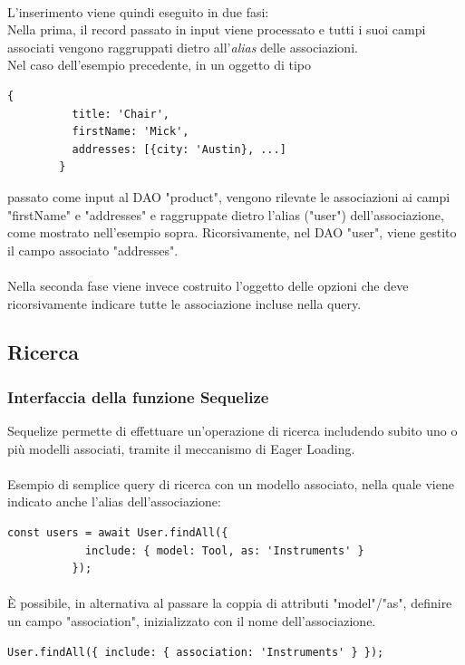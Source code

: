 \documentclass[a4paper, 12pt]{report}
\begin{document}
      \paragraph*{}
      L'inserimento viene quindi eseguito in due fasi:\\
      Nella prima, il record passato in input viene processato e tutti i suoi campi associati vengono raggruppati dietro all'\emph{alias} delle associazioni.\\
      Nel caso dell'esempio precedente, in un oggetto di tipo
      \begin{Verbatim}[samepage=true]
        {
          title: 'Chair', 
          firstName: 'Mick',
          addresses: [{city: 'Austin}, ...]
        }
      \end{Verbatim}
      passato come input al DAO "product", vengono rilevate le associazioni ai campi "firstName" e "addresses" e raggruppate dietro l'alias ("user") dell'associazione, come mostrato nell'esempio sopra.
      Ricorsivamente, nel DAO "user", viene gestito il campo associato "addresses".
      \paragraph*{}
      Nella seconda fase viene invece costruito l'oggetto delle opzioni che deve ricorsivamente indicare tutte le associazione incluse nella query.

    \newpage
    \subsection{Ricerca}
      \subsubsection*{Interfaccia della funzione Sequelize}
        Sequelize permette di effettuare un'operazione di ricerca includendo subito uno o più modelli associati, tramite il meccanismo di Eager Loading.
        \paragraph*{}
        Esempio di semplice query di ricerca con un modello associato, nella quale viene indicato anche l'alias dell'associazione:
        \begin{Verbatim}[samepage=true]
          const users = await User.findAll({
            include: { model: Tool, as: 'Instruments' }
          });
        \end{Verbatim}
        \paragraph*{}
        È possibile, in alternativa al passare la coppia di attributi "model"/"as", definire un campo "association", inizializzato con il nome dell'associazione.
        \begin{Verbatim}[samepage=true]
          User.findAll({ include: { association: 'Instruments' } });
        \end{Verbatim}
\end{document}
